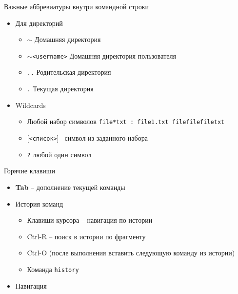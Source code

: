 \documentclass[ignorenonframetext, professionalfonts, hyperref={pdftex, unicode}]{beamer}
\begin{document}
\begin{frame}{Важные аббревиатуры внутри командной строки}
  \begin{itemize}
    \item Для директорий
      \begin{itemize}
        \item {\tt $\sim$} Домашняя директория
        \item {\tt $\sim$<username>} Домашняя директория пользователя
        \item {\tt ..} Родительская директория
        \item {\tt .} Текущая директория
      \end{itemize}
      \pause  
    \item Wildcards
      \begin{itemize}
        \item {\tt *} Любой набор символов {\tt file*txt : file1.txt filefilefiletxt}
        \item {\tt $[$<список>$]$ } символ из заданного набора {\tt }
        \item {\tt ?} любой один символ
      \end{itemize}

  \end{itemize}
\end{frame}       

\begin{frame}{Горячие клавиши}
  \begin{itemize}
    \item \textbf{Tab} -- дополнение текущей команды
      \pause
    \item История команд
      \begin{itemize}
        \item Клавиши курсора -- навигация по истории
        \item Ctrl-R -- поиск в истории по фрагменту
        \item Ctrl-O (после выполнения вставить следующую команду из истории)
        \item Команда {\tt history}
      \end{itemize}
    \item Навигация

  \end{itemize}
\end{frame}
\end{document}
